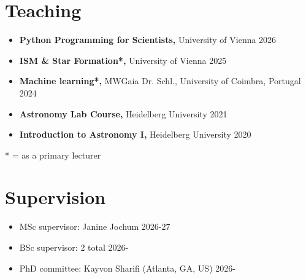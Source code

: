 \section*{Teaching}

\begin{itemize}
    \item \textbf{Python Programming for Scientists,} University of Vienna \hfill 2026
    \item \textbf{ISM \& Star Formation*,} University of Vienna \hfill 2025
    \item \textbf{Machine learning*,} MWGaia Dr. Schl., University of Coimbra, Portugal \hfill 2024
    \item \textbf{Astronomy Lab Course,} Heidelberg University \hfill 2021
    \item \textbf{Introduction to Astronomy I,} Heidelberg University \hfill 2020
\end{itemize}

* = as a primary lecturer


\section*{Supervision}

\begin{itemize}
    \item MSc supervisor: Janine Jochum \hfill 2026-27
    \item BSc supervisor: 2 total \hfill 2026-
    \item PhD committee: Kayvon Sharifi (Atlanta, GA, US) \hfill 2026-
\end{itemize}
